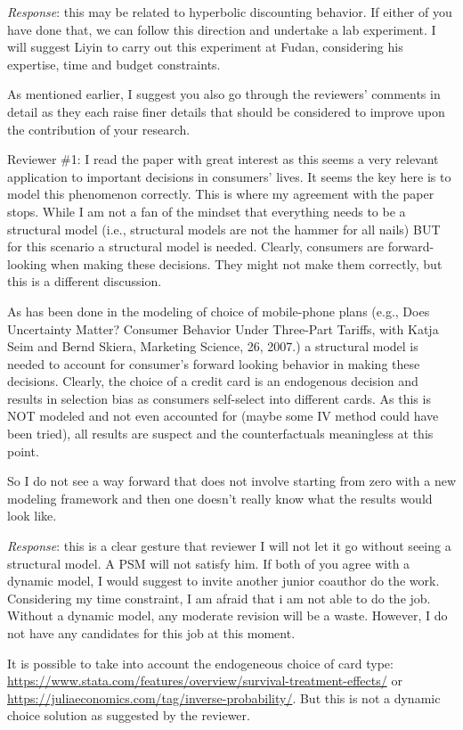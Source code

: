 \documentclass[titlepage,12pt,letterpaper]{article}
\numberwithin{equation}{section}
\begin{document}
\emph{Response}: this may be related to hyperbolic discounting behavior. If either of you have done that, we can follow this direction and undertake a lab experiment. I will suggest Liyin to carry out this experiment at Fudan, considering his expertise, time and budget constraints. 

As mentioned earlier, I suggest you also go through the reviewers’ comments in detail as they each raise finer details that should be considered to improve upon the contribution of your research.


Reviewer \#1: I read the paper with great interest as this seems a very relevant application to important decisions in consumers' lives. It seems the key here is to model this phenomenon correctly. This is where my agreement with the paper stops. While I am not a fan of the mindset that everything needs to be a structural model (i.e., structural models are not the hammer for all nails) BUT for this scenario a structural model is needed. Clearly, consumers are forward-looking when making these decisions. They might not make them correctly, but this is a different discussion.

As has been done in the modeling of choice of mobile-phone plans (e.g., Does Uncertainty Matter? Consumer Behavior Under Three-Part Tariffs, with Katja Seim and Bernd Skiera, Marketing Science, 26, 2007.) a structural model is needed to account for consumer's forward looking behavior in making these decisions. Clearly, the choice of a credit card is an endogenous decision and results in selection bias as consumers self-select into different cards. As this is NOT modeled and not even accounted for (maybe some IV method could have been tried), all results are suspect and the counterfactuals meaningless at this point.

So I do not see a way forward that does not involve starting from zero with a new modeling framework and then one doesn't really know what the results would look like.

\emph{Response}: this is a clear gesture that reviewer I will not let it go without seeing a structural model. A PSM will not satisfy him. If both of you agree with a dynamic model, I would suggest to invite another junior coauthor do the work. Considering my time constraint, I am afraid that i am not able to do the job. Without a dynamic model, any moderate revision will be a waste. However, I do not have any candidates for this job at this moment. 

It is possible to take into account the endogeneous choice of card type: \url{https://www.stata.com/features/overview/survival-treatment-effects/} or \url{https://juliaeconomics.com/tag/inverse-probability/}. But this is not a dynamic choice solution as suggested by the reviewer. 
\end{document}
